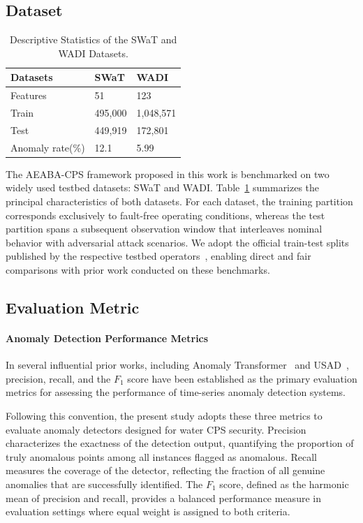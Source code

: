 \documentclass[pdflatex,sn-mathphys-num]{sn-jnl}
\theoremstyle{thmstyleone}
\theoremstyle{thmstyletwo}
\theoremstyle{thmstylethree}
\begin{document}
\subsection{Dataset}
\begin{table}[h!] 
\centering
\caption{Descriptive Statistics of the SWaT and WADI Datasets.}
\label{tab:dataset_summary}
\small
\begin{tabularx}{\linewidth}{XXX}
\toprule
\textbf{Datasets} & \textbf{SWaT} & \textbf{WADI} \\ 
\midrule
Features & 51 & 123 \\ 
Train &  495,000 &  1,048,571\\ 
Test &  449,919 & 172,801 \\ 
Anomaly rate(\%) & 12.1 & 5.99 \\   
\bottomrule
\end{tabularx}
\end{table}
The AEABA-CPS framework proposed in this work is benchmarked on two widely used testbed datasets: SWaT and WADI. Table~\ref{tab:dataset_summary} summarizes the principal characteristics of both datasets. 
For each dataset, the training partition corresponds exclusively to fault-free operating conditions, whereas the test partition spans a subsequent observation window that interleaves nominal behavior with adversarial attack scenarios. We adopt the official train-test splits published by the respective testbed operators~\cite{ahmed2017wadi, mathur2016swat}, enabling direct and fair comparisons with prior work conducted on these benchmarks.



\subsection{Evaluation Metric}
\paragraph{Anomaly Detection Performance Metrics}
In several influential prior works, including Anomaly Transformer~\cite{xu2022anomaly} and USAD~\cite{audibert2020usad}, precision, recall, and the $F_1$ score have been established as the primary evaluation metrics for assessing the performance of time-series anomaly detection systems.

Following this convention, the present study adopts these three metrics to evaluate anomaly detectors designed for water CPS security. Precision characterizes the exactness of the detection output, quantifying the proportion of truly anomalous points among all instances flagged as anomalous. Recall measures the coverage of the detector, reflecting the fraction of all genuine anomalies that are successfully identified. The $F_1$ score, defined as the harmonic mean of precision and recall, provides a balanced performance measure in evaluation settings where equal weight is assigned to both criteria.
\end{document}
